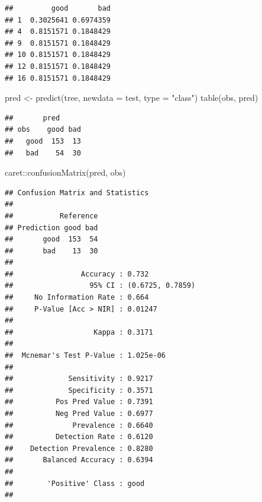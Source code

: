 \documentclass[
]{book}
\newenvironment{Shaded}{\begin{snugshade}}{\end{snugshade}}
\newcommand{\AttributeTok}[1]{\textcolor[rgb]{0.77,0.63,0.00}{#1}}
\newcommand{\FunctionTok}[1]{\textcolor[rgb]{0.00,0.00,0.00}{#1}}
\newcommand{\NormalTok}[1]{#1}
\newcommand{\OtherTok}[1]{\textcolor[rgb]{0.56,0.35,0.01}{#1}}
\newcommand{\SpecialCharTok}[1]{\textcolor[rgb]{0.00,0.00,0.00}{#1}}
\newcommand{\StringTok}[1]{\textcolor[rgb]{0.31,0.60,0.02}{#1}}
\theoremstyle{break}
\theoremstyle{definition}
\theoremstyle{definition}
\theoremstyle{definition}
\theoremstyle{definition}
\theoremstyle{remark}
\begin{document}
\begin{verbatim}
##         good       bad
## 1  0.3025641 0.6974359
## 4  0.8151571 0.1848429
## 9  0.8151571 0.1848429
## 10 0.8151571 0.1848429
## 12 0.8151571 0.1848429
## 16 0.8151571 0.1848429
\end{verbatim}

\begin{Shaded}
\begin{Highlighting}[]
\NormalTok{pred }\OtherTok{\textless{}{-}} \FunctionTok{predict}\NormalTok{(tree, }\AttributeTok{newdata =}\NormalTok{ test, }\AttributeTok{type =} \StringTok{"class"}\NormalTok{)}
\FunctionTok{table}\NormalTok{(obs, pred)}
\end{Highlighting}
\end{Shaded}

\begin{verbatim}
##       pred
## obs    good bad
##   good  153  13
##   bad    54  30
\end{verbatim}

\begin{Shaded}
\begin{Highlighting}[]
\NormalTok{caret}\SpecialCharTok{::}\FunctionTok{confusionMatrix}\NormalTok{(pred, obs)}
\end{Highlighting}
\end{Shaded}

\begin{verbatim}
## Confusion Matrix and Statistics
## 
##           Reference
## Prediction good bad
##       good  153  54
##       bad    13  30
##                                           
##                Accuracy : 0.732           
##                  95% CI : (0.6725, 0.7859)
##     No Information Rate : 0.664           
##     P-Value [Acc > NIR] : 0.01247         
##                                           
##                   Kappa : 0.3171          
##                                           
##  Mcnemar's Test P-Value : 1.025e-06       
##                                           
##             Sensitivity : 0.9217          
##             Specificity : 0.3571          
##          Pos Pred Value : 0.7391          
##          Neg Pred Value : 0.6977          
##              Prevalence : 0.6640          
##          Detection Rate : 0.6120          
##    Detection Prevalence : 0.8280          
##       Balanced Accuracy : 0.6394          
##                                           
##        'Positive' Class : good            
## 
\end{verbatim}
\end{document}
